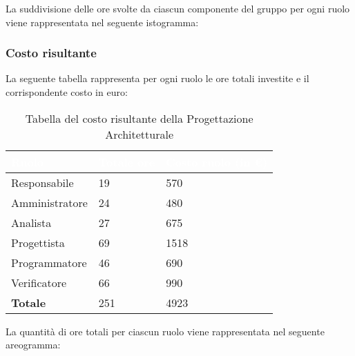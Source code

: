 La suddivisione delle ore svolte da ciascun componente del gruppo per ogni ruolo viene rappresentata nel seguente istogramma:
\begin{center}
	\pgfplotsset{width=17cm, height=8.5cm}
\end{center}

\clearpage

\subsubsection{Costo risultante}
La seguente tabella rappresenta per ogni ruolo le ore totali investite e il corrispondente costo in euro:
{
\renewcommand{\arraystretch}{2}
\begin{longtable}{ C{3cm} C{2cm} C{4cm}}
\caption{Tabella del costo risultante della Progettazione Architetturale}\\

\textcolor{white}{\textbf{Ruolo}} & 
\textcolor{white}{\textbf{Totale ore}} & 
\textcolor{white}{\textbf{Costo ruolo (in \euro{})}}\\	
\endhead
        
Responsabile    &  19 &  570 \\
Amministratore  &  24 &  480 \\
Analista        &  27 &  675 \\
Progettista     &  69 & 1518 \\
Programmatore   &  46 &  690 \\
Verificatore    &  66 &  990 \\
\textbf{Totale} & 251 & 4923 \\	
        	
\end{longtable}
}

La quantità di ore totali per ciascun ruolo viene rappresentata nel seguente areogramma:
\begin{center}
\end{center}